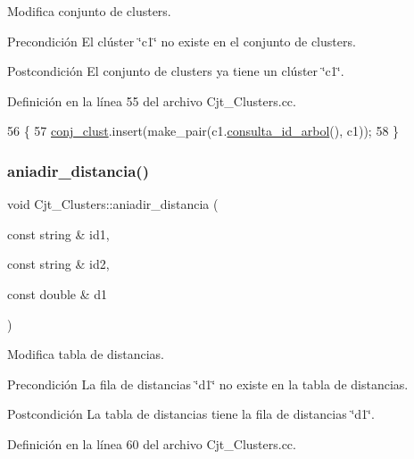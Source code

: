 Modifica conjunto de clusters. 

\begin{DoxyPrecond}{Precondición}
El clúster \char`\"{}c1\char`\"{} no existe en el conjunto de clusters. 
\end{DoxyPrecond}
\begin{DoxyPostcond}{Postcondición}
El conjunto de clusters ya tiene un clúster \char`\"{}c1\char`\"{}. 
\end{DoxyPostcond}


Definición en la línea 55 del archivo Cjt\+\_\+\+Clusters.\+cc.


\begin{DoxyCode}
56 \{
57     \hyperlink{class_cjt___clusters_a1202e93aafa953b2dc9a76d03f056b08}{conj\_clust}.insert(make\_pair(c1.\hyperlink{class_cluster_a2e994baf889c15dbb0e6111070c08d5d}{consulta\_id\_arbol}(), c1));
58 \}
\end{DoxyCode}
\mbox{\label{class_cjt___clusters_aa6b67053039c17daaa752db7ca9d62bb}} 
\subsubsection{\texorpdfstring{aniadir\+\_\+distancia()}{aniadir\_distancia()}}
{\footnotesize\ttfamily void Cjt\+\_\+\+Clusters\+::aniadir\+\_\+distancia (\begin{DoxyParamCaption}\item[{const string \&}]{id1,  }\item[{const string \&}]{id2,  }\item[{const double \&}]{d1 }\end{DoxyParamCaption})}



Modifica tabla de distancias. 

\begin{DoxyPrecond}{Precondición}
La fila de distancias \char`\"{}d1\char`\"{} no existe en la tabla de distancias. 
\end{DoxyPrecond}
\begin{DoxyPostcond}{Postcondición}
La tabla de distancias tiene la fila de distancias \char`\"{}d1\char`\"{}. 
\end{DoxyPostcond}


Definición en la línea 60 del archivo Cjt\+\_\+\+Clusters.\+cc.


